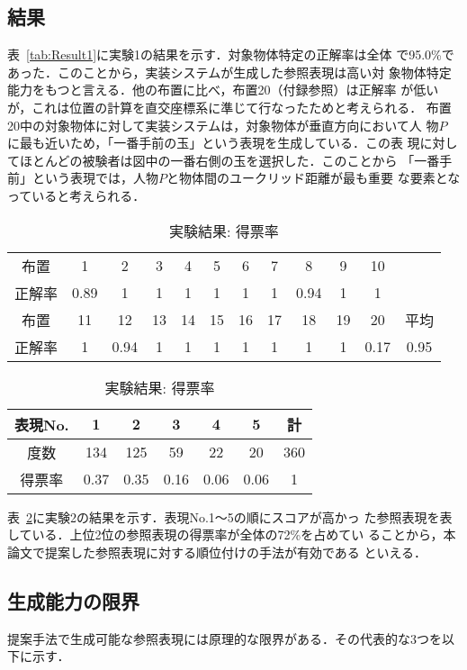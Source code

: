 \documentclass[japanese]{jnlp_1.2}
\begin{document}
\subsection{結果}

表~\ref{tab:Result1}に実験1の結果を示す．対象物体特定の正解率は全体
で95.0\%であった．このことから，実装システムが生成した参照表現は高い対
象物体特定能力をもつと言える．他の布置に比べ，布置20（付録参照）は正解率
が低いが，これは位置の計算を直交座標系に準じて行なったためと考えられる．
布置20中の対象物体に対して実装システムは，対象物体が垂直方向において人
物$P$ に最も近いため，「一番手前の玉」という表現を生成している．この表
現に対してほとんどの被験者は図中の一番右側の玉を選択した．このことから
「一番手前」という表現では，人物$P$と物体間のユークリッド距離が最も重要
な要素となっていると考えられる．

\begin{table}[b]
  \centering
  \caption{実験結果: 正解率}
  \label{tab:Result1}
  \vspace{1mm}
  \begin{tabular}{c|cccccccccc|c}
   \cline{1-11}
   布置 & 1 & 2 & 3 & 4 & 5 & 6 & 7 & 8 & 9 & 10 \\
   正解率  & 0.89 & 1 & 1 & 1 & 1 & 1 & 1 & 0.94 & 1 & 1 \\
   \hline
   \hline
   布置 & 11 & 12 & 13 & 14 & 15 & 16 & 17 & 18 & 19 & 20 & 平均  \\
   正解率  & 1 & 0.94 & 1 & 1 & 1 & 1 & 1 & 1 & 1 & 0.17 & 0.95  \\
   \hline
  \end{tabular}
    \vspace{10pt}
  \centering
  \caption{実験結果: 得票率}
  \label{tab:Result2}
  \vspace{1mm}
  \begin{tabular}{c|ccccc|c}
   \hline
   表現No.  & 1 & 2 & 3 & 4 & 5 & 計 \\ \hline
   度数  & 134 & 125 & 59 & 22 & 20 & 360 \\
   得票率   & 0.37 & 0.35 & 0.16 & 0.06 & 0.06 & 1 \\
   \hline
  \end{tabular}
\end{table}


表~\ref{tab:Result2}に実験2の結果を示す．表現No.1〜5の順にスコアが高かっ
た参照表現を表している．上位2位の参照表現の得票率が全体の72\%を占めてい
ることから，本論文で提案した参照表現に対する順位付けの手法が有効である
といえる．


\subsection{生成能力の限界}
提案手法で生成可能な参照表現には原理的な限界がある．その代表的な3つを以
下に示す．
\end{document}

